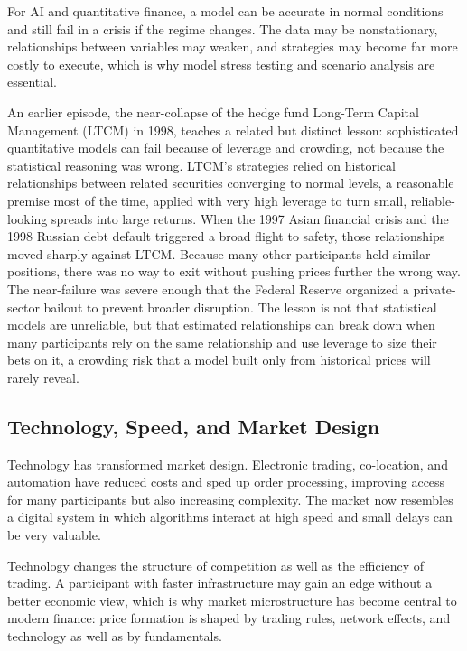 \documentclass[../ai_in_finance]{subfiles}
\begin{document}
For AI and quantitative finance, a model can be accurate in normal conditions and still fail in a crisis if the regime changes. The data may be nonstationary, relationships between variables may weaken, and strategies may become far more costly to execute, which is why model stress testing and scenario analysis are essential.

An earlier episode, the near-collapse of the hedge fund Long-Term Capital Management (LTCM) in 1998, teaches a related but distinct lesson: sophisticated quantitative models can fail because of leverage and crowding, not because the statistical reasoning was wrong. LTCM's strategies relied on historical relationships between related securities converging to normal levels, a reasonable premise most of the time, applied with very high leverage to turn small, reliable-looking spreads into large returns.
When the 1997 Asian financial crisis and the 1998 Russian debt default triggered a broad flight to safety, those relationships moved sharply against LTCM. Because many other participants held similar positions, there was no way to exit without pushing prices further the wrong way. The near-failure was severe enough that the Federal Reserve organized a private-sector bailout to prevent broader disruption. The lesson is not that statistical models are unreliable, but that estimated relationships can break down when many participants rely on the same relationship and use leverage to size their bets on it, a crowding risk that a model built only from historical prices will rarely reveal.

\subsection{Technology, Speed, and Market Design}

Technology has transformed market design. Electronic trading, co-location, and automation have reduced costs and sped up order processing, improving access for many participants but also increasing complexity. The market now resembles a digital system in which algorithms interact at high speed and small delays can be very valuable.

Technology changes the structure of competition as well as the efficiency of trading. A participant with faster infrastructure may gain an edge without a better economic view, which is why market microstructure has become central to modern finance: price formation is shaped by trading rules, network effects, and technology as well as by fundamentals.
\end{document}
